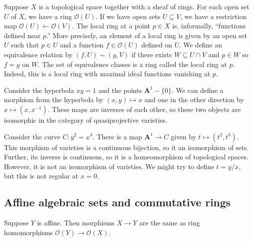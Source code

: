 \documentclass[11pt, oneside,margin=1in]{article}
\begin{document}
Suppose $X$ is a topological space together with a sheaf of rings. For each open set $U$ of $X$, we have a ring $\mathscr{O}(U)$. If we have open sets $U\subseteq V$, we have a restriction map $\mathscr{O} (U)  \longleftarrow \mathscr{O}(V)$. The local ring at a point $p\in X$ is, informally, ``functions defined near $p$.'' More precisely, an element of a local ring is given by an open set $U$ such that $p\in U$ and a function $f\in \mathscr{O}(U)$ defined on $U$. We define an equivalence relation by $(f,U)\sim  (g,V)$ if there exists $W\subseteq U\cap V$ and $p\in W$  so $f=g$ on $W$. The set of equivalence classes is a ring called the local ring at $p$. Indeed, this is a local ring with maximal ideal functions vanishing at $p$.

\begin{example}[ ]\label{}\text{}
Consider the hyperbola $xy=1$ and the points $\mathbf{A}^1-\{0\}$. We can define a morphism from the hyperbola by $(x,y)\longmapsto x$ and one in the other direction by $x\longmapsto (x,x^{-1})$. These maps are inverses of each other, so these two objects are isomorphic in the category of quasiprojective varieties.
\end{example}

\begin{example}[ ]\label{}\text{}
Consider the curve $C: y^2=x^3$. There is a map $\mathbf{A}^1\longrightarrow C$ given by $t\longmapsto (t^2,t^3)$. This morphism of varieties is a continuous bijection, so it an isomorphism of sets. Further, its inverse is continuous, so it is a homeomorphism of topological spaces. However, it is not an isomorphism of varieties. We might try to define $t = y/x$, but this is not regular at $x=0$.
\end{example}

\subsection{Affine algebraic sets and commutative rings}

\begin{theorem}[ ]\label{}\index{}\text{}
Suppose $Y$ is affine. Then morphisms $X\longrightarrow Y$ are the same as ring homomorphisms $\mathscr{O}(Y)  \longrightarrow \mathscr{O}(X)$.
\end{theorem}
\end{document}
